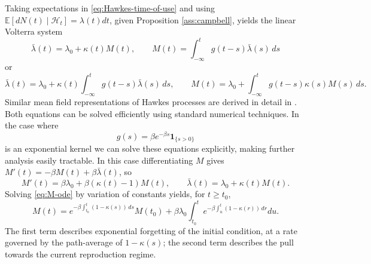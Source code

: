 \documentclass{article}
\theoremstyle{plain}
\theoremstyle{definition}
\newcommand{\E}{\mathbb{E}}
\newcommand{\1}{\mathbf{1}}
\begin{document}
    Taking expectations in \eqref{eq:Hawkes-time-of-use} and using $\E[dN(t)\mid\mathcal H_t]=\lambda(t) dt$, given Proposition \ref{ass:campbell}, yields the linear Volterra system
    \begin{equation*}
    \label{eq:Volterra}
    \bar\lambda(t)=\lambda_0+\kappa(t) M(t),
    \qquad
    M(t)=\int_{-\infty}^t g(t-s) \bar\lambda(s)\, ds
    \end{equation*}
    or
    \begin{equation*}
    \bar\lambda(t)=\lambda_0+\kappa(t) \int_{-\infty}^t g(t-s) \bar\lambda(s)\, ds,
    \qquad
    M(t)=\lambda_0+\int_{-\infty}^t g(t-s)\kappa(s) M(s)\, ds.
    \end{equation*}
    Similar mean field representations of Hawkes processes are derived in detail in \cite{chevallier2017mean,dassios2011dynamic}. Both equations can be solved efficiently using standard numerical techniques. In the case where
    \[g(s)=\beta e^{-\beta s}\1_{\{s>0\}}\] 
    is an exponential kernel we can solve these equations explicitly, making further analysis easily tractable. In this case differentiating $M$ gives
    \(
    M'(t)=-\beta M(t)+\beta \bar\lambda(t)
    \),
    so
    \begin{equation}
    \label{eq:M-ode}
    M'(t)=\beta\lambda_0+\beta(\kappa(t)-1)M(t),\qquad
    \bar\lambda(t)=\lambda_0+\kappa(t)M(t).
    \end{equation}
    Solving \eqref{eq:M-ode} by variation of constants yields, for $t\ge t_0$,
    \begin{equation}
        \label{eq:odesol}
        M(t) =
    e^{-\beta \int_{t_0}^t (1-\kappa(s) )\, ds}
    M(t_0) + \beta \lambda_0
    \int_{t_0}^t
    e^{-\beta \int_{u}^t (1-\kappa(r))\, dr}
    du.
    \end{equation}
    The first term describes exponential forgetting of the initial condition, at a rate governed by the path-average of $1-\kappa(s)$; the second term describes the pull towards the current reproduction regime.
    
\end{document}
